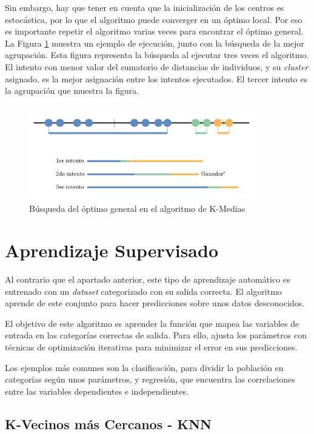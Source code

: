 		Sin embargo, hay que tener en cuenta que la inicialización de los centros es estocástica, por lo que el algoritmo puede converger en un óptimo local. Por eso es importante repetir el algoritmo varias veces para encontrar el óptimo general. La Figura \ref{fig:kmediasBusqueda} muestra un ejemplo de ejecución, junto con la búsqueda de la mejor agrupación. Esta figura representa la búsqueda al ejecutar tres veces el algoritmo. El intento con menor valor del sumatorio de distancias de individuos, y su \textit{cluster} asignado, es la mejor asignación entre los intentos ejecutados. El tercer intento es la agrupación que muestra la figura.


		\begin{figure}[!h]
			\centering
			\includegraphics[width=0.9\textwidth]{images/chapter_2/kmedias}
			\caption{Búsqueda del óptimo general en el algoritmo de K-Medias}
			\label{fig:kmediasBusqueda}
		\end{figure}
		
		\newpage


\section{Aprendizaje Supervisado}
	Al contrario que el apartado anterior, este tipo de aprendizaje automático es entrenado con un \textit{dataset} categorizado con su salida correcta. El algoritmo aprende de este conjunto para hacer predicciones sobre unos datos desconocidos.
	
	El objetivo de este algoritmo es aprender la función que mapea las variables de entrada en las categorías correctas de salida. Para ello, ajusta los parámetros con técnicas de optimización iterativas para minimizar el error en sus predicciones.
	
	Los ejemplos más comunes son la clasificación, para dividir la población en categorías según unos parámetros, y regresión, que encuentra las correlaciones entre las variables dependientes e independientes.


	\subsection{K-Vecinos más Cercanos - KNN}

